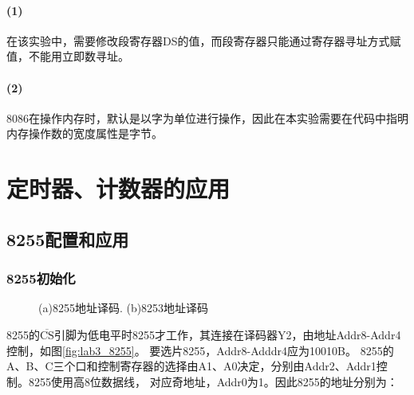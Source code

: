 \documentclass[12pt, a4paper, oneside]{ctexart}
\begin{document}
    \paragraph{(1)} 在该实验中，需要修改段寄存器DS的值，而段寄存器只能通过寄存器寻址方式赋值，不能用立即数寻址。
    \paragraph{(2)} 8086在操作内存时，默认是以字为单位进行操作，因此在本实验需要在代码中指明内存操作数的宽度属性是字节。
    \section{定时器、计数器的应用}
    \subsection{8255配置和应用}
    \subsubsection{8255初始化}

    \begin{figure}[!h]
        \centering
        \hfil
        \caption{(a)8255地址译码. (b)8253地址译码}
    \end{figure} 
    
    8255的$\overline{\text{CS}}$引脚为低电平时8255才工作，其连接在译码器Y2，由地址Addr8-Addr4控制，如图\ref{fig:lab3_8255}。
    要选片8255，Addr8-Adddr4应为10010B。
    8255的A、B、C三个口和控制寄存器的选择由A1、A0决定，分别由Addr2、Addr1控制。8255使用高8位数据线，
    对应奇地址，Addr0为1。因此8255的地址分别为：
\end{document}
